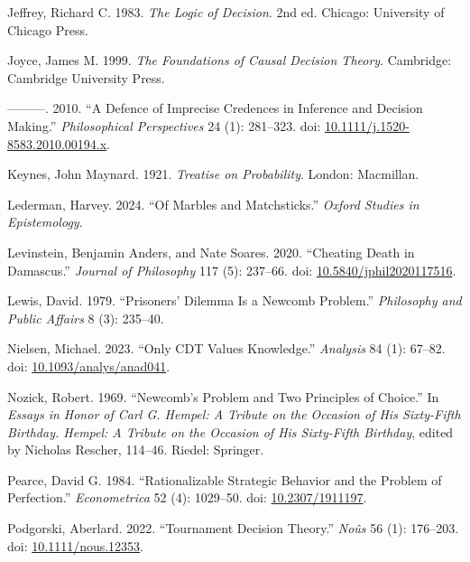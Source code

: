 \documentclass[
  11pt,
  letterpaper,
  DIV=11,
  numbers=noendperiod,
  twoside]{scrartcl}
\newlength{\cslhangindent}
\newenvironment{CSLReferences}[2] %
 {\begin{list}{}{%
  \setlength{\itemindent}{0pt}
  \setlength{\leftmargin}{0pt}
  \setlength{\parsep}{0pt}
  \ifodd #1
   \setlength{\leftmargin}{\cslhangindent}
   \setlength{\itemindent}{-1\cslhangindent}
  \fi
  \setlength{\itemsep}{#2\baselineskip}}}
 {\end{list}}
\begin{document}
\begin{CSLReferences}{1}{0}
Jeffrey, Richard C. 1983. \emph{The Logic of Decision}. 2nd ed. Chicago:
University of Chicago Press.

Joyce, James M. 1999. \emph{The Foundations of Causal Decision Theory}.
Cambridge: Cambridge University Press.

---------. 2010. {``A Defence of Imprecise Credences in Inference and
Decision Making.''} \emph{Philosophical Perspectives} 24 (1): 281--323.
doi:
\href{https://doi.org/10.1111/j.1520-8583.2010.00194.x}{10.1111/j.1520-8583.2010.00194.x}.

Keynes, John Maynard. 1921. \emph{Treatise on Probability}. London:
Macmillan.

Lederman, Harvey. 2024. {``Of Marbles and Matchsticks.''} \emph{Oxford
Studies in Epistemology}.

Levinstein, Benjamin Anders, and Nate Soares. 2020. {``Cheating Death in
Damascus.''} \emph{Journal of Philosophy} 117 (5): 237--66. doi:
\href{https://doi.org/10.5840/jphil2020117516}{10.5840/jphil2020117516}.

Lewis, David. 1979. {``Prisoners' Dilemma Is a {N}ewcomb Problem.''}
\emph{Philosophy and Public Affairs} 8 (3): 235--40.

Nielsen, Michael. 2023. {``Only {CDT} Values Knowledge.''}
\emph{Analysis} 84 (1): 67--82. doi:
\href{https://doi.org/10.1093/analys/anad041}{10.1093/analys/anad041}.

Nozick, Robert. 1969. {``Newcomb's Problem and Two Principles of
Choice.''} In \emph{Essays in Honor of Carl {G}. Hempel: A Tribute on
the Occasion of His Sixty-Fifth Birthday. Hempel: A Tribute on the
Occasion of His Sixty-Fifth Birthday}, edited by Nicholas Rescher,
114--46. Riedel: Springer.

Pearce, David G. 1984. {``Rationalizable Strategic Behavior and the
Problem of Perfection.''} \emph{Econometrica} 52 (4): 1029--50. doi:
\href{https://doi.org/10.2307/1911197}{10.2307/1911197}.

Podgorski, Aberlard. 2022. {``Tournament Decision Theory.''}
\emph{No{û}s} 56 (1): 176--203. doi:
\href{https://doi.org/10.1111/nous.12353}{10.1111/nous.12353}.


\end{CSLReferences}
\end{document}
